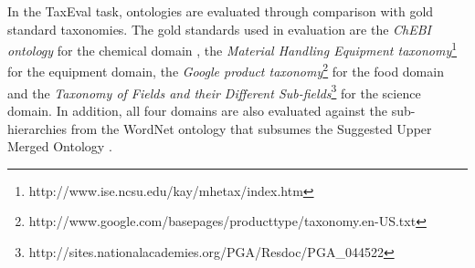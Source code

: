 In the TaxEval task, ontologies are evaluated through comparison with gold standard taxonomies. The gold standards used in evaluation are the \emph{ChEBI ontology} for the chemical domain \citep{degtyarenko2008chebi}, the \emph{Material Handling Equipment taxonomy}\footnote{http://www.ise.ncsu.edu/kay/mhetax/index.htm} for the equipment domain, the \emph{Google product taxonomy}\footnote{http://www.google.com/basepages/producttype/taxonomy.en-US.txt} for the food domain and the\emph{ Taxonomy of Fields and their Different Sub-fields}\footnote{http://sites.nationalacademies.org/PGA/Resdoc/PGA\_044522} for the science domain. In addition, all four domains are also evaluated against the sub-hierarchies from the WordNet ontology that subsumes the Suggested Upper Merged Ontology \citep{PeaseEtAl2002sumo}.
